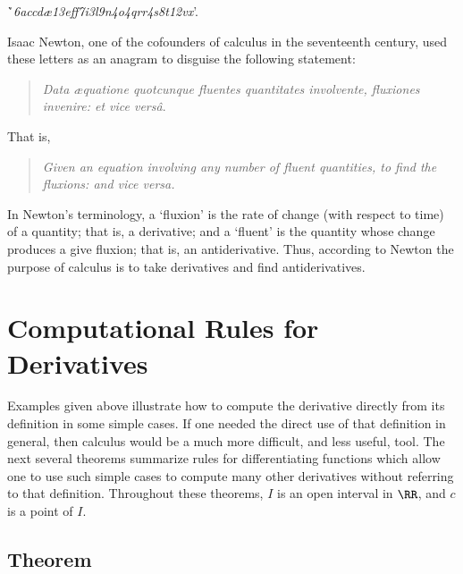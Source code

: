 {\VA

        \h `{\em 6accd{\ae}13eff7i3l9n4o4qrr4s8t12vx}'.

\VA

\noindent Isaac Newton, one of the cofounders of calculus in the seventeenth century, used these letters as an anagram to disguise the following statement:

\begin{quotation}
{\footnotesize
      {\em Data {\ae}quatione quotcunque fluentes quantitates involvente, fluxiones invenire: et vice vers\^{a}}.
}%
\end{quotation}

    That is,
\begin{quotation}
{\footnotesize 
    \em Given an equation involving any number of fluent quantities, to find the fluxions: and vice versa.
}%
\end{quotation}

\noindent In Newton's terminology, a `fluxion' is the rate of change (with respect to time) of a quantity; that is, a derivative;
    and a `fluent' is the quantity whose change produces a give fluxion; that is, an antiderivative.
    Thus, according to Newton the purpose of calculus is to take derivatives and find antiderivatives.

}%



                \section{{\bf Computational Rules for Derivatives}}
                \label{SectE30}
        
\VV

        Examples given above illustrate how to compute the derivative directly from its definition in some simple cases.
    If one needed the direct use of that definition in general, then calculus would be a much more difficult, and less useful, tool.
    The next several theorems summarize rules for differentiating functions which allow one to use such simple cases to compute many other derivatives without referring to that definition.
        Throughout these theorems, $I$ is an open interval in ${\RR}$, and $c$ is a point of $I$.

\V

            \subsection{\small{\bf Theorem}}
            \label{ThmE30.20}

